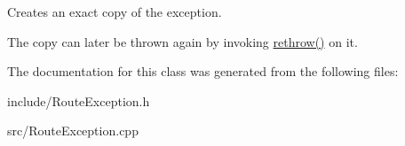 Creates an exact copy of the exception.

The copy can later be thrown again by invoking \hyperlink{classecodtn_1_1net_1_1RouteException_aea7a52fb632b2ad24b0d8cd04dfb08d3}{rethrow()} on it. 

The documentation for this class was generated from the following files\+:\begin{DoxyCompactItemize}
\item 
include/Route\+Exception.\+h\item 
src/Route\+Exception.\+cpp\end{DoxyCompactItemize}
